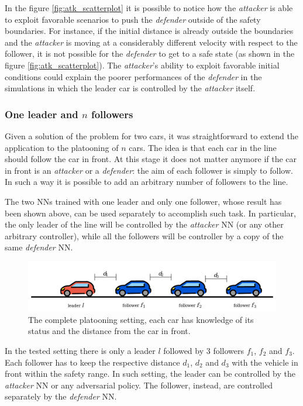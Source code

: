 In the figure \ref{fig:atk_scatterplot} it is possible to notice how the \textit{attacker} is able to exploit favorable scenarios to push the \textit{defender} outside of the safety boundaries.
For instance, if the initial distance is already outside the boundaries and the \textit{attacker} is moving at a considerably different velocity with respect to the follower, it is not possible for the \textit{defender} to get to a safe state (as shown in the figure \ref{fig:atk_scatterplot}).
The \textit{attacker}'s ability to exploit favorable initial conditions could explain the poorer performances of the \textit{defender} in the simulations in which the leader car is controlled by the \textit{attacker} itself.

\subsubsection{One leader and $n$ followers}
Given a solution of the problem for two cars, it was straightforward to extend the application to the platooning of $n$ cars.
The idea is that each car in the line should follow the car in front.
At this stage it does not matter anymore if the car in front is an \textit{attacker} or a \textit{defender}: the aim of each follower is simply to follow.
In such a way it is possible to add an arbitrary number of followers to the line.

The two NNs trained with one leader and only one follower, whose result has been shown above, can be used separately to accomplish such task.
In particular, the only leader of the line will be controlled by the \textit{attacker} NN (or any other arbitrary controller), while all the followers will be controller by a copy of the same \textit{defender} NN.

\begin{figure}[H]
	\centering
	\includegraphics[width=12cm, keepaspectratio]{img/5_3_complete_platooning.png}
	\caption{The complete platooning setting, each car has knowledge of its status and the distance from the car in front.}
\end{figure}

In the tested setting there is only a leader $l$ followed by $3$ followers $f_1$, $f_2$ and $f_3$.
Each follower has to keep the respective distance $d_1$, $d_2$ and $d_3$ with the vehicle in front within the safety range.
In such setting, the leader can be controlled by the \textit{attacker} NN or any adversarial policy.
The follower, instead, are controlled separately by the \textit{defender} NN.

